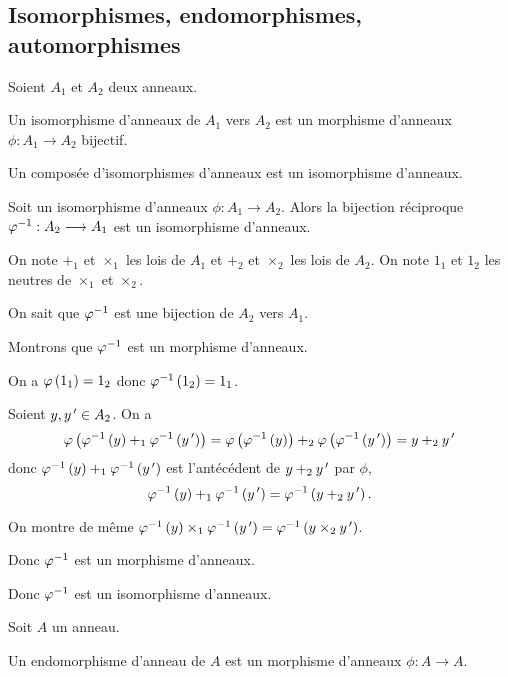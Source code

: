 \subsection{Isomorphismes, endomorphismes, automorphismes}

\begin{defi}[Isomorphisme]
Soient \(A_1\) et \(A_2\) deux anneaux.

Un isomorphisme d'anneaux de \(A_1\) vers \(A_2\) est un morphisme d'anneaux \(\phi:A_1\to A_2\) bijectif.
\end{defi}

\begin{oubli}
Un composée d'isomorphismes d'anneaux est un isomorphisme d'anneaux.
\end{oubli}

\begin{theo}
Soit un isomorphisme d'anneaux \(\phi:A_1\to A_2\). Alors la bijection réciproque \(\varphi^{-1}:A_2\longrightarrow A_1\) est un isomorphisme d'anneaux.
\end{theo}

\begin{dem}
On note \(+_1\) et \(\times_1\) les lois de \(A_1\) et \(+_2\) et \(\times_2\) les lois de \(A_2\). On note \(1_1\) et \(1_2\) les neutres de \(\times_1\) et \(\times_2\).

On sait que \(\varphi^{-1}\) est une bijection de \(A_2\) vers \(A_1\).

Montrons que \(\varphi^{-1}\) est un morphisme d'anneaux.

On a \(\varphi\left(1_1\right)=1_2\) donc \(\varphi^{-1}\left(1_2\right)=1_1\).

Soient \(y,y^{\,\prime}\in A_2\). On a \[\varphi\left(\varphi^{-1}\left(y\right)+_1\varphi^{-1}\left(y^{\,\prime}\right)\right)=\varphi\left(\varphi^{-1}\left(y\right)\right)+_2\varphi\left(\varphi^{-1}\left(y^{\,\prime}\right)\right)=y+_2y^{\,\prime}\] donc \(\varphi^{-1}\left(y\right)+_1\varphi^{-1}\left(y^{\,\prime}\right)\) est l'antécédent de \(y+_2y^{\,\prime}\) par \(\phi\), \cad \[\varphi^{-1}\left(y\right)+_1\varphi^{-1}\left(y^{\,\prime}\right)=\varphi^{-1}\left(y+_2y^{\,\prime}\right).\]

On montre de même \(\varphi^{-1}\left(y\right)\times_1\varphi^{-1}\left(y^{\,\prime}\right)=\varphi^{-1}\left(y\times_2y^{\,\prime}\right)\).

Donc \(\varphi^{-1}\) est un morphisme d'anneaux.

Donc \(\varphi^{-1}\) est un isomorphisme d'anneaux.
\end{dem}

\begin{defi}[Endomorphisme]
Soit \(A\) un anneau.

Un endomorphisme d'anneau de \(A\) est un morphisme d'anneaux \(\phi:A\to A\).
\end{defi}

